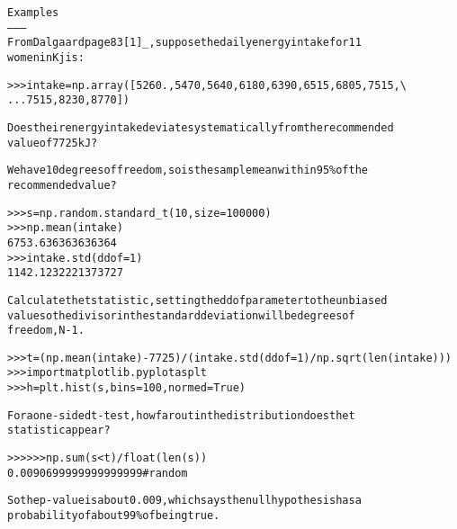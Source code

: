 \begin{boxedminipage}{\funcwidth}
\begin{alltt}
Examples
--------
From Dalgaard page 83 [1]\_, suppose the daily energy intake for 11
women in Kj is:

{\textgreater}{\textgreater}{\textgreater} intake = np.array([5260., 5470, 5640, 6180, 6390, 6515, 6805, 7515, {\textbackslash}
...                    7515, 8230, 8770])

Does their energy intake deviate systematically from the recommended
value of 7725 kJ?

We have 10 degrees of freedom, so is the sample mean within 95\% of the
recommended value?

{\textgreater}{\textgreater}{\textgreater} s = np.random.standard\_t(10, size=100000)
{\textgreater}{\textgreater}{\textgreater} np.mean(intake)
6753.636363636364
{\textgreater}{\textgreater}{\textgreater} intake.std(ddof=1)
1142.1232221373727

Calculate the t statistic, setting the ddof parameter to the unbiased
value so the divisor in the standard deviation will be degrees of
freedom, N-1.

{\textgreater}{\textgreater}{\textgreater} t = (np.mean(intake)-7725)/(intake.std(ddof=1)/np.sqrt(len(intake)))
{\textgreater}{\textgreater}{\textgreater} import matplotlib.pyplot as plt
{\textgreater}{\textgreater}{\textgreater} h = plt.hist(s, bins=100, normed=True)

For a one-sided t-test, how far out in the distribution does the t
statistic appear?

{\textgreater}{\textgreater}{\textgreater} {\textgreater}{\textgreater}{\textgreater} np.sum(s{\textless}t) / float(len(s))
0.0090699999999999999  \#random

So the p-value is about 0.009, which says the null hypothesis has a
probability of about 99\% of being true.
\end{alltt}

\setlength{\parskip}{1ex}
    \end{boxedminipage}

    \label{trunk:qstkutil:bollinger:triangular}

    \vspace{0.5ex}

